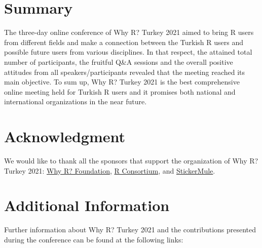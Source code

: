 




\newpage
\section{Summary}

The three-day online conference of Why R? Turkey 2021 aimed to bring R users from different fields and make a connection between the Turkish R users and possible future users from various disciplines. In that respect, the attained total number of participants, the fruitful Q\&A sessions and the overall positive attitudes from all speakers/participants revealed that the meeting reached its main objective. To sum up, Why R? Turkey 2021 is the best comprehensive online meeting held for Turkish R users and it promises both national and international organizations in the near future. 

\section{Acknowledgment}
We would like to thank all the sponsors that support the organization of Why R? Turkey 2021: \href{http://whyr.pl/foundation/about/}{Why R? Foundation}, \href{https://www.r-consortium.org}{R Consortium}, and \href{https://www.stickermule.com}{StickerMule}. 

\section{Additional Information}
Further information about Why R? Turkey 2021 and the contributions presented during the conference can be found at the following links:

